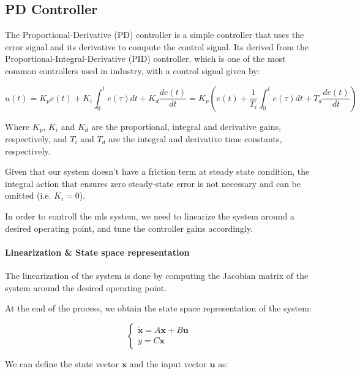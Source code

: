 \subsection{PD Controller}
\label{sec:pd}

The Proportional-Derivative (PD) controller is a simple controller that uses the error signal and its derivative to compute the control signal.
Its derived from the Proportional-Integral-Derivative (PID) controller, which is one of the most common controllers used in industry, with a control signal given by:

\begin{equation}
    u(t) = K_p e(t) + K_i \int_{0}^{t} e(\tau)dt + K_d \frac{de(t)}{dt} = K_p \left(e(t) + \frac{1}{T_i} \int_{0}^{t} e(\tau)dt + T_d \frac{de(t)}{dt}\right)
\end{equation}

Where $K_p$, $K_i$ and $K_d$ are the proportional, integral and derivative gains, respectively, and $T_i$ and $T_d$ are the integral and derivative time constants, respectively.

Given that our system doesn't have a friction term at steady state condition, the integral action that ensures zero steady-state error is not necessary and can be omitted (i.e. $K_i = 0$).

In order to controll the \acrshort{mls} system, we need to linearize the system around a desired operating point, and tune the controller gains accordingly.

\paragraph{Linearization \& State space representation}

The linearization of the system is done by computing the Jacobian matrix of the system around the desired operating point.

At the end of the process, we obtain the state space representation of the system:

\begin{equation}
    \begin{cases}
        \dot{\mathbf{x}} = A \mathbf{x} + B \mathbf{u} \\
        y = C \mathbf{x}
    \end{cases}
\end{equation}

We can define the state vector $\mathbf{x}$ and the input vector $\mathbf{u}$ as:

